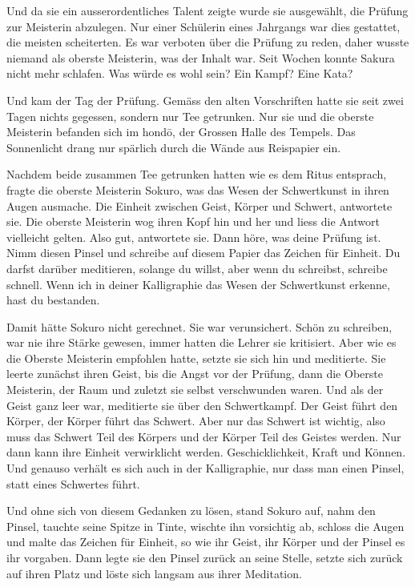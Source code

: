 Und da sie ein ausserordentliches Talent zeigte wurde sie ausgewählt, die Prüfung zur Meisterin abzulegen. Nur einer Schülerin eines Jahrgangs war dies gestattet, die meisten scheiterten. Es war verboten über die Prüfung zu reden, daher wusste niemand als oberste Meisterin, was der Inhalt war. Seit Wochen konnte Sakura nicht mehr schlafen. Was würde es wohl sein? Ein Kampf? Eine Kata?

Und kam der Tag der Prüfung. Gemäss den alten Vorschriften hatte sie seit zwei Tagen nichts gegessen, sondern nur Tee getrunken. Nur sie und die oberste Meisterin befanden sich im hondō, der Grossen Halle des Tempels. Das Sonnenlicht drang nur spärlich durch die Wände aus Reispapier ein.

Nachdem beide zusammen Tee getrunken hatten wie es dem Ritus entsprach, fragte die oberste Meisterin Sokuro, was das Wesen der Schwertkunst in ihren Augen ausmache. Die Einheit zwischen Geist, Körper und Schwert, antwortete sie. Die oberste Meisterin wog ihren Kopf hin und her und liess die Antwort vielleicht gelten. Also gut, antwortete sie. Dann höre, was deine Prüfung ist. Nimm diesen Pinsel und schreibe auf diesem Papier das Zeichen für Einheit. Du darfst darüber meditieren, solange du willst, aber wenn du schreibst, schreibe schnell. Wenn ich in deiner Kalligraphie das Wesen der Schwertkunst erkenne, hast du bestanden.

Damit hätte Sokuro nicht gerechnet. Sie war verunsichert. Schön zu schreiben, war nie ihre Stärke gewesen, immer hatten die Lehrer sie kritisiert. Aber wie es die Oberste Meisterin empfohlen hatte, setzte sie sich hin und meditierte. Sie leerte zunächst ihren Geist, bis die Angst vor der Prüfung, dann die Oberste Meisterin, der Raum und zuletzt sie selbst verschwunden waren. Und als der Geist ganz leer war, meditierte sie über den Schwertkampf. Der Geist führt den Körper, der Körper führt das Schwert. Aber nur das Schwert ist wichtig, also muss das Schwert Teil des Körpers und der Körper Teil des Geistes werden. Nur dann kann ihre Einheit verwirklicht werden. Geschicklichkeit, Kraft und Können. Und genauso verhält es sich auch in der Kalligraphie, nur dass man einen Pinsel, statt eines Schwertes führt.

Und ohne sich von diesem Gedanken zu lösen, stand Sokuro auf, nahm den Pinsel, tauchte seine Spitze in Tinte, wischte ihn vorsichtig ab, schloss die Augen und malte das Zeichen für Einheit, so wie ihr Geist, ihr Körper und der Pinsel es ihr vorgaben. Dann legte sie den Pinsel zurück an seine Stelle, setzte sich zurück auf ihren Platz und löste sich langsam aus ihrer Meditation.

